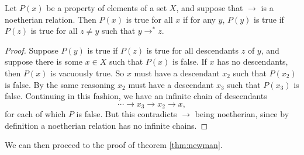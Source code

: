 \documentclass[libertine,widepage,nosubthm]{lmaths}
\begin{document}
\begin{prop}
	Let $P(x)$ be a property of elements of a set $X$, and suppose that $\rightarrow$ is a noetherian relation. Then $P(x)$ is true for all $x$ if for any $y$, $P(y)$ is true if $P(z)$ is true for all $z \ne y$ such that $y \rightarrow^* z$.
\end{prop}
\begin{proof}
	Suppose $P(y)$ is true if $P(z)$ is true for all descendants $z$ of $y$, and suppose there is some $x \in X$ such that $P(x)$ is false. If $x$ has no descendants, then $P(x)$ is vacuously true. So $x$ must have a descendant $x_2$ such that $P(x_2)$ is false. By the same reasoning $x_2$ must have a descendant $x_3$ such that $P(x_3)$ is false. Continuing in this fashion, we have an infinite chain of descendants
		\[ \cdots \to x_3 \to x_2 \to x, \]
	for each of which $P$ is false. But this contradicts $\to$ being noetherian, since by definition a noetherian relation has no infinite chains.
\end{proof}

We can then proceed to the proof of theorem \ref{thm:newman}.
\end{document}
